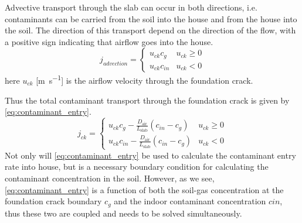Advective transport through the slab can occur in both directions, i.e. contaminants can be carried from the soil into the house and from the house into the soil\cite{holton_creation_2018}.
The direction of this transport depend on the direction of the flow, with a positive sign indicating that airflow goes into the house.
\begin{equation}
  j_{advection} = \begin{cases}
    u_{ck} c_g & u_{ck} \geq 0 \\
    u_{ck} c_{in} & u_{ck} < 0
\end{cases}
\end{equation}
here $u_{ck}$ [\si{\metre\per\second}] is the airflow velocity through the foundation crack.

Thus the total contaminant transport through the foundation crack is given by \eqref{eq:contaminant_entry}.
\begin{equation}\label{eq:contaminant_entry}
  j_{ck} = \begin{cases}
    u_{ck} c_g - \frac{D_\mathrm{air}}{L_\mathrm{slab}} (c_{in} - c_g) & u_{ck} \geq 0 \\
    u_{ck} c_{in} - \frac{D_\mathrm{air}}{L_\mathrm{slab}} (c_{in} - c_g) & u_{ck} < 0
\end{cases}
\end{equation}
Not only will \eqref{eq:contaminant_entry} be used to calculate the contaminant entry rate into house, but is a necessary boundary condition for calculating the contaminant concentration in the soil.
However, as we see, \eqref{eq:contaminant_entry} is a function of both the soil-gas concentration at the foundation crack boundary $c_g$ and the indoor contaminant concentration $c{in}$, thus these two are coupled and needs to be solved simultaneously.\par
